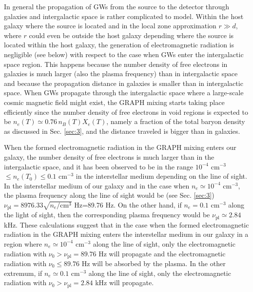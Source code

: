 \documentclass[a4paper,11pt]{article}
\begin{document}
In general the propagation of GWs from the source to the detector through galaxies and intergalactic space is rather complicated to model. Within the host galaxy where the source is located and in the local zone approximation $r\gg d$, where $r$ could even be outside the host galaxy depending where the source is located within the host galaxy, the generation of electromagnetic radiation is negligible (see below) with respect to the case when GWs enter the intergalactic space region. This happens because the number density of free electrons in galaxies is much larger (also the plasma frequency) than in intergalactic space and because the propagation distance in galaxies is smaller than in intergalactic space. When GWs propagate through the intergalactic space where a large-scale cosmic magnetic field might exist, the GRAPH mixing starts taking place efficiently since the number density of free electrons in void regions is expected to be $n_e(T) \simeq 0.76\, n_B(T) X_e(T)$, namely a fraction of the total baryon density as discussed in Sec. \ref{sec:3}, and the distance traveled is bigger than in galaxies.

When the formed electromagnetic radiation in the GRAPH mixing enters our galaxy, the number density of free electrons is much larger than in the intergalactic space, and it has been observed to be in the range $10^{-4}$ cm$^{-3}$ $\leq n_e(T_0)\leq 0.1$ cm$^{-3}$ in the interstellar medium depending on the line of sight. In the interstellar medium of our galaxy and in the case when $n_e\simeq 10^{-4}$ cm$^{-3}$, the plasma frequency along the line of sight would be (see Sec. \ref{sec:3}) $\nu_\text{pl}=8976.33\sqrt{n_e/\text{cm}^3}$ Hz=89.76 Hz. On the other hand, if $n_e=0.1$ cm$^{-3}$ along the light of sight, then the corresponding plasma frequency would be $\nu_\text{pl} \simeq 2.84$ kHz. 
These calculations suggest that in the case when the formed electromagnetic radiation in the GRAPH mixing enters the interstellar medium in our galaxy in a region where $n_e\simeq 10^{-4}$ cm$^{-3}$ along the line of sight, only the electromagnetic radiation with $\nu_0> \nu_\text{pl}=89.76$ Hz will propagate and the electromagnetic radiation with $\nu_0\leq 89.76$ Hz will be absorbed by the plasma. In the other extremum, if $n_e\simeq 0.1$ cm$^{-3}$ along the line of sight, only the electromagnetic radiation with $\nu_0> \nu_\text{pl}=2.84$ kHz will propagate. 
\end{document}
